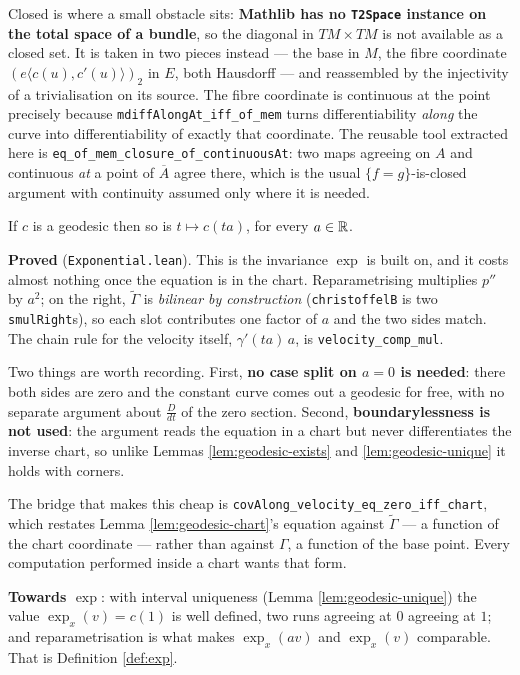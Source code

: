\begin{lemma}
  Closed is where a small obstacle sits: \textbf{Mathlib has no \texttt{T2Space} instance on the
  total space of a bundle}, so the diagonal in $TM \times TM$ is not available as a closed set.
  It is taken in two pieces instead --- the base in $M$, the fibre coordinate
  $(e\langle c(u), c'(u)\rangle)_2$ in $E$, both Hausdorff --- and reassembled by the
  injectivity of a trivialisation on its source. The fibre coordinate is continuous at the point
  precisely because \texttt{mdiffAlongAt\_iff\_of\_mem} turns differentiability \emph{along} the
  curve into differentiability of exactly that coordinate. The reusable tool extracted here is
  \texttt{eq\_of\_mem\_closure\_of\_continuousAt}: two maps agreeing on $A$ and continuous
  \emph{at} a point of $\overline{A}$ agree there, which is the usual $\{f = g\}$-is-closed
  argument with continuity assumed only where it is needed.
\end{lemma}

\begin{lemma}
  \label{lem:geodesic-reparam}
  \leanok
  If $c$ is a geodesic then so is $t \mapsto c(ta)$, for every $a \in \mathbb{R}$.

  \textbf{Proved} (\texttt{Exponential.lean}). This is the invariance $\exp$ is built on, and it
  costs almost nothing once the equation is in the chart. Reparametrising multiplies $p''$ by
  $a^2$; on the right, $\tilde\Gamma$ is \emph{bilinear by construction}
  (\texttt{christoffelB} is two \texttt{smulRight}s), so each slot contributes one factor of
  $a$ and the two sides match. The chain rule for the velocity itself,
  $\gamma'(ta)\,a$, is \texttt{velocity\_comp\_mul}.

  Two things are worth recording. First, \textbf{no case split on $a = 0$ is needed}: there both
  sides are zero and the constant curve comes out a geodesic for free, with no separate argument
  about $\frac{D}{dt}$ of the zero section. Second, \textbf{boundarylessness is not used}: the
  argument reads the equation in a chart but never differentiates the inverse chart, so unlike
  Lemmas \ref{lem:geodesic-exists} and \ref{lem:geodesic-unique} it holds with corners.

  The bridge that makes this cheap is \texttt{covAlong\_velocity\_eq\_zero\_iff\_chart}, which
  restates Lemma \ref{lem:geodesic-chart}'s equation against $\tilde\Gamma$ --- a function of the
  chart coordinate --- rather than against $\Gamma$, a function of the base point. Every
  computation performed inside a chart wants that form.

  \textbf{Towards $\exp$}: with interval uniqueness (Lemma \ref{lem:geodesic-unique}) the value
  $\exp_x(v) = c(1)$ is well defined, two runs agreeing at $0$ agreeing at $1$; and
  reparametrisation is what makes $\exp_x(av)$ and $\exp_x(v)$ comparable. That is
  Definition \ref{def:exp}.
\end{lemma}

